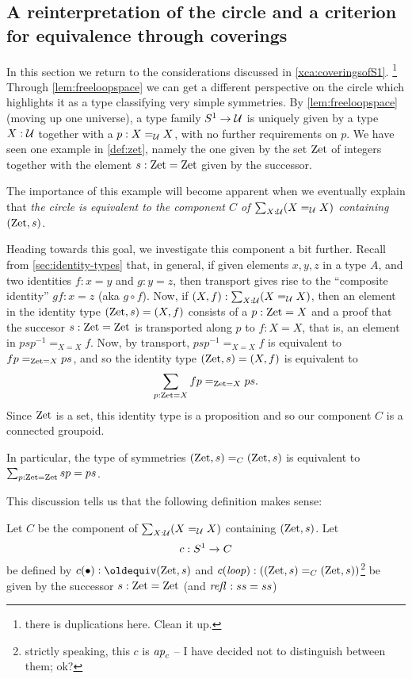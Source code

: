 \subsection{A reinterpretation of the circle and a criterion for equivalence through coverings}
\label{sec:S1isC}
In this section we return to the considerations discussed in \cref{xca:coveringsofS1}.
 \footnote{there is duplications here.  Clean it up.}
  Through \cref{lem:freeloopspace} we can get a different perspective on the circle which highlights it as a type classifying very simple symmetries.
By \cref{lem:freeloopspace} (moving up one universe), a type family $S^1\to\mathcal{U}$ is uniquely given by a type $X:\mathcal{U}$ together with a $p:X=_{\mathcal{U}} X$, with no further requirements on $p$.  We have seen one example in \cref{def:zet}, namely the one given by the set $\mathrm{Zet}$ of integers together with the element $s:\mathrm{Zet}=\mathrm{Zet}$ given by the successor.  

The importance of this example will become apparent when we eventually explain that \emph{the circle is equivalent to the component $C$ of $\sum_{X:\mathcal{U}}(X=_{\mathcal{U}}X)$ containing $(\mathrm{Zet},s)$}. 

Heading towards this goal, we investigate this component a bit further.  Recall from \cref{sec:identity-types} that, in general, if given elements $x,y,z$ in a type $A$, and two identities $f:x=y$ and $g:y=z$, then transport gives rise to the ``composite identity'' $gf:x=z$ (aka $g\circ f$).    Now, if $(X,f):\sum_{X:\mathcal{U}}(X=_{\mathcal{U}}X)$, then an element in the identity type $(\mathrm{Zet},s)=(X,f)$ consists of a $p:\mathrm{Zet}=X$ and a proof that the succesor $s:\mathrm{Zet}=\mathrm{Zet}$  is transported along $p$ to $f:X=X$, that is, an element in $psp^{-1}=_{X=X}f$.  Now, by transport, $psp^{-1}=_{X=X}f$ is equivalent to $fp=_{\mathrm{Zet}=X}ps$, and so the identity type $(\mathrm{Zet},s)=(X,f)$ is equivalent to
$$\sum_{p:\mathrm{Zet}=X}fp=_{\mathrm{Zet}=X}ps.$$ %
Since $\mathrm{Zet}$ is a set, this identity type is a proposition and so our component $C$ is a connected groupoid.  

In particular, the type of symmetries $(\mathrm{Zet},s)=_C(\mathrm{Zet},s)$ is equivalent to $\sum_{p:\mathrm{Zet}=\mathrm{Zet}}sp=ps$.  

This discussion tells us that the following definition makes sense:

\begin{definition}\label{def:S1toC}
  Let $C$ be the component of $\sum_{X:\mathcal{U}}(X=_{\mathcal{U}}X)$ containing $(\mathrm{Zet},s)$.
  Let $$c:S^1\to C$$ be defined by $c(\base)\defequi (\zet,s)$ and $c(\mathit{loop}):((\mathrm{Zet},s)=_C(\mathrm{Zet},s))$\footnote{strictly speaking, this $c$ is $\mathop{{\it ap}_{c}}$ -- I have decided not to distinguish between them; ok?} be given by the successor $s:\mathrm{Zet}=\mathrm{Zet}$ (and $\mathop{{\it refl}_{}}:ss=ss$)
\end{definition}

